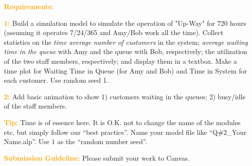 \documentclass{article}
\begin{document}
\vskip 0.15in
\textcolor{orange}{\bf Requirements:}
\vskip 0.1in

\textcolor{orange}{\bf 1:} Build a simulation model to simulate the operation of "Up-Way" for 720 hours (assuming it operates 7/24/365 and Amy/Bob work all the time). Collect statistics on the \textit{time average number of customers} in the system; \textit{average waiting time in the queue} with Amy and the queue with Bob, respectively; the utilization of the two staff members, respectively; and display them in a textbox. Make a time plot for Waiting Time in Queue (for Amy and Bob) and Time in System for each customer. Use random seed 1. 

\vskip 0.15in
\textcolor{orange}{\bf 2:} Add basic animation to show 1) customers waiting in the queues; 2) busy/idle of the staff members. 


\vskip 0.15in
\textcolor{orange}{\bf Tip:} Time is of essence here. It is O.K. not to change the name of the modules etc. but simply follow our ``best practice''. Name your model file like ``Q\#2\_Your Name.alp''. Use $1$ as the ``random number seed''.

\vskip 0.15in
\textcolor{orange}{\bf Submission Guideline:} Please submit your work to Canvas. 
\end{document}
